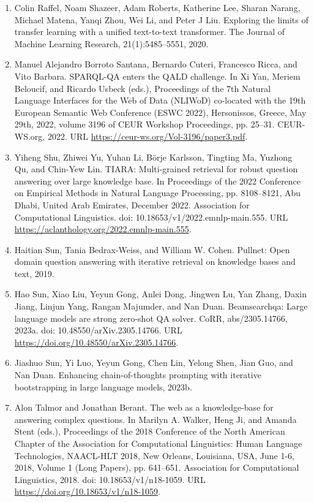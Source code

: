 \documentclass[11pt,UTF8,fontset=fandol]{ctexart}
\begin{document}
\begin{enumerate}[leftmargin=2em]
\item Colin Raffel, Noam Shazeer, Adam Roberts, Katherine Lee, Sharan Narang, Michael Matena, Yanqi Zhou, Wei Li, and Peter J Liu. Exploring the limits of transfer learning with a unified text-to-text transformer. The Journal of Machine Learning Research, 21(1):5485--5551, 2020.
\item Manuel Alejandro Borroto Santana, Bernardo Cuteri, Francesco Ricca, and Vito Barbara. SPARQL-QA enters the QALD challenge. In Xi Yan, Meriem Beloucif, and Ricardo Usbeck (eds.), Proceedings of the 7th Natural Language Interfaces for the Web of Data (NLIWoD) co-located with the 19th European Semantic Web Conference (ESWC 2022), Hersonissos, Greece, May 29th, 2022, volume 3196 of CEUR Workshop Proceedings, pp. 25--31. CEUR-WS.org, 2022. URL \url{https://ceur-ws.org/Vol-3196/paper3.pdf}.
\item Yiheng Shu, Zhiwei Yu, Yuhan Li, B\"{o}rje Karlsson, Tingting Ma, Yuzhong Qu, and Chin-Yew Lin. TIARA: Multi-grained retrieval for robust question answering over large knowledge base. In Proceedings of the 2022 Conference on Empirical Methods in Natural Language Processing, pp. 8108--8121, Abu Dhabi, United Arab Emirates, December 2022. Association for Computational Linguistics. doi: 10.18653/v1/2022.emnlp-main.555. URL \url{https://aclanthology.org/2022.emnlp-main.555}.
\item Haitian Sun, Tania Bedrax-Weiss, and William W. Cohen. Pullnet: Open domain question answering with iterative retrieval on knowledge bases and text, 2019.
\item Hao Sun, Xiao Liu, Yeyun Gong, Anlei Dong, Jingwen Lu, Yan Zhang, Daxin Jiang, Linjun Yang, Rangan Majumder, and Nan Duan. Beamsearchqa: Large language models are strong zero-shot QA solver. CoRR, abs/2305.14766, 2023a. doi: 10.48550/arXiv.2305.14766. URL \url{https://doi.org/10.48550/arXiv.2305.14766}.
\item Jiashuo Sun, Yi Luo, Yeyun Gong, Chen Lin, Yelong Shen, Jian Guo, and Nan Duan. Enhancing chain-of-thoughts prompting with iterative bootstrapping in large language models, 2023b.
\item Alon Talmor and Jonathan Berant. The web as a knowledge-base for answering complex questions. In Marilyn A. Walker, Heng Ji, and Amanda Stent (eds.), Proceedings of the 2018 Conference of the North American Chapter of the Association for Computational Linguistics: Human Language Technologies, NAACL-HLT 2018, New Orleans, Louisiana, USA, June 1-6, 2018, Volume 1 (Long Papers), pp. 641--651. Association for Computational Linguistics, 2018. doi: 10.18653/v1/n18-1059. URL \url{https://doi.org/10.18653/v1/n18-1059}.

\end{enumerate}
\end{document}
